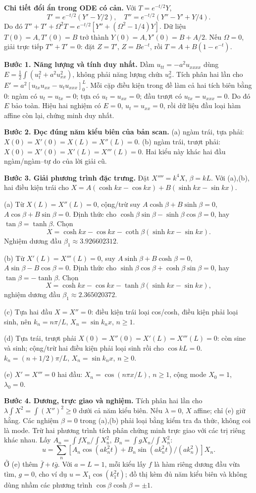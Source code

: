 \textbf{Chi tiết đổi ẩn trong ODE có cản.} Với $T=e^{-t/2}Y$,
\[T'=e^{-t/2}(Y'-Y/2),\quad T''=e^{-t/2}(Y''-Y'+Y/4).\]
Do đó $T''+T'+\Omega^2T=e^{-t/2}[Y''+(\Omega^2-1/4)Y]$. Dữ liệu $T(0)=A,T'(0)=B$ trở thành $Y(0)=A,Y'(0)=B+A/2$. Nếu $\Omega=0$, giải trực tiếp $T''+T'=0$: đặt $Z=T'$, $Z=Be^{-t}$, rồi $T=A+B(1-e^{-t})$.

\textbf{Bước 1. Năng lượng và tính duy nhất.} Dầm $u_{tt}=-a^2u_{xxxx}$ dùng $E=\frac12\int(u_t^2+a^2u_{xx}^2)$, không phải năng lượng chứa $u_x^2$. Tích phân hai lần cho $E'=a^2[u_{tx}u_{xx}-u_tu_{xxx}]_0^L$. Mỗi cặp điều kiện trong đề làm cả hai tích biên bằng $0$: ngàm có $u_t=u_{tx}=0$; tựa có $u_t=u_{xx}=0$; đầu trượt có $u_{tx}=u_{xxx}=0$. Do đó $E$ bảo toàn. Hiệu hai nghiệm có $E=0$, $u_t=u_{xx}=0$, rồi dữ liệu đầu loại hàm affine còn lại, chứng minh duy nhất.

\textbf{Bước 2. Đọc đúng năm kiểu biên của bản scan.} (a) ngàm trái, tựa phải: $X(0)=X'(0)=X(L)=X''(L)=0$. (b) ngàm trái, trượt phải: $X(0)=X'(0)=X'(L)=X'''(L)=0$. Hai kiểu này khác hai đầu ngàm/ngàm–tự do của lời giải cũ.

\textbf{Bước 3. Giải phương trình đặc trưng.} Đặt $X''''=k^4X$, $\beta=kL$. Với (a),(b), hai điều kiện trái cho $X=A(\cosh kx-\cos kx)+B(\sinh kx-\sin kx)$.

(a) Từ $X(L)=X''(L)=0$, cộng/trừ suy $A\cosh\beta+B\sinh\beta=0$, $A\cos\beta+B\sin\beta=0$. Định thức cho $\cosh\beta\sin\beta-\sinh\beta\cos\beta=0$, hay $\tan\beta=\tanh\beta$. Chọn
\[X=\cosh kx-\cos kx-\coth\beta(\sinh kx-\sin kx).\]
Nghiệm dương đầu $\beta_1\approx3.926602312$.

(b) Từ $X'(L)=X'''(L)=0$, suy $A\sinh\beta+B\cosh\beta=0$, $A\sin\beta-B\cos\beta=0$. Định thức cho $\sinh\beta\cos\beta+\cosh\beta\sin\beta=0$, hay $\tan\beta=-\tanh\beta$. Chọn
\[X=\cosh kx-\cos kx-\tanh\beta(\sinh kx-\sin kx),\]
nghiệm dương đầu $\beta_1\approx2.365020372$.

(c) Tựa hai đầu $X=X''=0$: điều kiện trái loại cos/cosh, điều kiện phải loại sinh, nên $k_n=n\pi/L$, $X_n=\sin k_nx$, $n\ge1$.

(d) Tựa trái, trượt phải $X(0)=X''(0)=X'(L)=X'''(L)=0$: còn sine và sinh; cộng/trừ hai điều kiện phải loại sinh rồi cho $\cos kL=0$. $k_n=(n+1/2)\pi/L$, $X_n=\sin k_nx$, $n\ge0$.

(e) $X'=X'''=0$ hai đầu: $X_n=\cos(n\pi x/L)$, $n\ge1$, cộng mode $X_0=1$, $\lambda_0=0$.

\textbf{Bước 4. Dương, trực giao và nghiệm.} Tích phân hai lần cho $\lambda\int X^2=\int(X'')^2\ge0$ dưới cả năm kiểu biên. Nếu $\lambda=0$, $X$ affine; chỉ (e) giữ hằng. Các nghiệm $\beta=0$ trong (a),(b) phải loại bằng kiểm tra đa thức, không coi là mode. Trừ hai phương trình tích phân chứng minh trực giao với các trị riêng khác nhau. Lấy $A_n=\int fX_n/\int X_n^2$, $B_n=\int gX_n/\int X_n^2$:
\[u=\sum_n[A_n\cos(ak_n^2t)+B_n\sin(ak_n^2t)/(ak_n^2)]X_n.\]
Ở (e) thêm $\bar f+t\bar g$. Với $a=L=1$, mỗi kiểu lấy $f$ là hàm riêng dương đầu vừa tìm, $g=0$, cho ví dụ $u=X_1\cos(k_1^2t)$; đồ thị kèm đủ năm kiểu biên và không dùng nhầm các phương trình $\cos\beta\cosh\beta=\pm1$.


